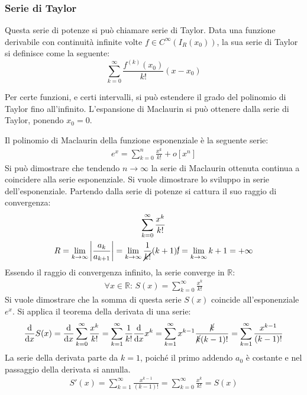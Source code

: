 \documentclass{article}
\numberwithin{equation}{subsection}
\begin{document}
\subsubsection{Serie di Taylor}

Questa serie di potenze si può chiamare serie di Taylor. Data una funzione derivabile con continuità infinite volte $f\in C^\infty(I_R(x_0)) $, la sua serie di Taylor si definisce come la seguente:
\begin{equation}
    \displaystyle\sum_{k=0}^\infty\frac{f^{(k)}(x_0)}{k!}(x-x_0)
\end{equation}

Per certe funzioni, e certi intervalli, si può estendere il grado del polinomio di Taylor fino all'infinito. L'espansione di Maclaurin si può ottenere dalla serie di Taylor, ponendo $x_0=0$.

Il polinomio di Maclaurin della funzione esponenziale è la seguente serie:
\begin{gather}
    e^x=\displaystyle\sum_{k=0}^n\frac{x^k}{k!}+o[x^n]
\end{gather}
Si può dimostrare che tendendo $n\to\infty$ la serie di Maclaurin ottenuta continua a coincidere alla serie esponenziale. Si vuole dimostrare lo sviluppo in serie dell'esponenziale. 
Partendo dalla serie di potenze si cattura il suo raggio di convergenza:
\begin{gather*}
    \displaystyle\sum_{k=0}^\infty\frac{x^k}{k!}\\
    R=\lim_{k\to\infty}\displaystyle\left|\frac{a_k}{a_{k+1}}\right|=
    \lim_{k\to\infty}\frac{1}{\cancel{k!}}(k+1)\cancel{!}=\lim_{k\to\infty}{k+1}=+\infty
\end{gather*}
Essendo il raggio di convergenza infinito, la serie converge in $\mathbb{R}$:
\begin{gather*}
    \forall x\in\mathbb{R}:\, S(x)=\displaystyle\sum_{k=0}^\infty\frac{x^k}{k!}
\end{gather*}
Si vuole dimostrare che la somma di questa serie $S(x)$ coincide all'esponenziale $e^x$. Si applica il teorema della derivata di una serie:
\begin{gather*}
    \displaystyle\frac{\mathrm{d}}{\mathrm{d}x}S(x)=\frac{\mathrm{d}}{\mathrm{d}x}\sum_{k=0}^\infty\frac{x^k}{k!}=
    \displaystyle\sum_{k=1}^\infty\frac{1}{k!}\frac{\mathrm{d}}{\mathrm{d}x}x^k=
    \sum_{k=1}^\infty x^{k-1}\frac{\cancel{k}}{\cancel{k}(k-1)!}=
    \displaystyle\sum_{k=1}^\infty\frac{x^{k-1}}{(k-1)!}
\end{gather*}
La serie della derivata parte da $k=1$, poiché il primo addendo $a_0$ è costante e nel passaggio della derivata si annulla. 
\begin{gather*}
    S'(x)=\displaystyle\sum_{k=1}^\infty\frac{x^{k-1}}{(k-1)!}=
    \displaystyle\sum_{k=0}^\infty\frac{x^{k}}{k!}=S(x)
\end{gather*}
\end{document}
